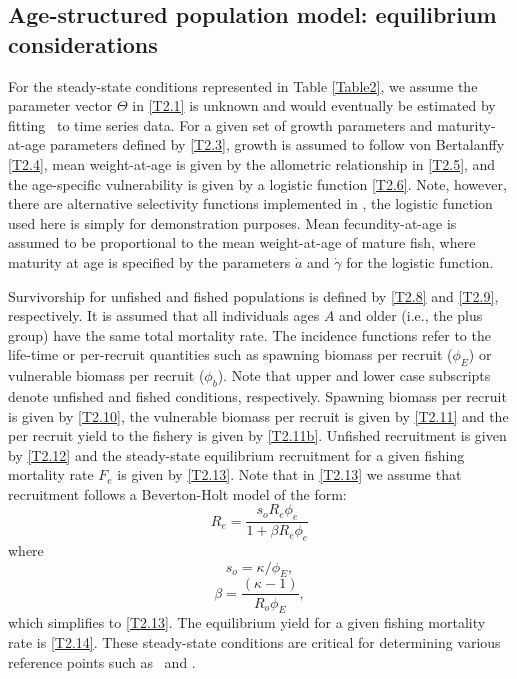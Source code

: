 \subsection{Age-structured population model: equilibrium considerations}
\begin{multicols}{2}
For the steady-state conditions represented in Table \ref{Table2}, we assume the parameter vector $\Theta$ in \eqref{T2.1} is unknown and would eventually be estimated by fitting \iscam\ to time series data.  For a given set of growth parameters and maturity-at-age parameters defined by \eqref{T2.3}, growth is assumed to follow von Bertalanffy \eqref{T2.4}, mean weight-at-age is given by the allometric relationship in \eqref{T2.5}, and the age-specific vulnerability is given by a logistic function \eqref{T2.6}.  Note, however, there are alternative selectivity functions implemented in \iscam, the logistic function used here is simply for demonstration purposes.  Mean fecundity-at-age is assumed to be proportional to the mean weight-at-age of mature fish, where maturity at age is specified by the parameters $\dot{a}$ and $\dot{\gamma}$ for the logistic function.

Survivorship for unfished and fished populations is defined by \eqref{T2.8} and \eqref{T2.9}, respectively.  It is assumed that all individuals ages $A$ and older (i.e., the plus group) have the same total mortality rate.  The incidence functions refer to the life-time or per-recruit quantities such as spawning biomass per recruit ($\phi_E$) or vulnerable biomass per recruit ($\phi_b$).  Note that upper and lower case subscripts denote unfished and fished conditions, respectively.  Spawning biomass per recruit is given by \eqref{T2.10}, the vulnerable biomass per recruit is given by \eqref{T2.11} and the per recruit yield to the fishery is given by \eqref{T2.11b}.  Unfished recruitment is given by \eqref{T2.12} and the steady-state equilibrium recruitment  for a given fishing mortality rate $F_e$ is given by \eqref{T2.13}.  Note that in \eqref{T2.13} we assume that recruitment follows a Beverton-Holt model of the form:
\[
R_e=\frac{s_o R_e \phi_e}{1+\beta R_e \phi_e}
\]
where
\[
s_o = \kappa/\phi_E,
\]
\[
\beta = \frac{(\kappa-1)}{R_o\phi_E},
\]
which simplifies to \eqref{T2.13}.
The equilibrium yield for a given fishing mortality rate is \eqref{T2.14}.  These steady-state conditions are critical for determining various reference points such as \fmsy\ and \bmsy.  










\end{multicols}
